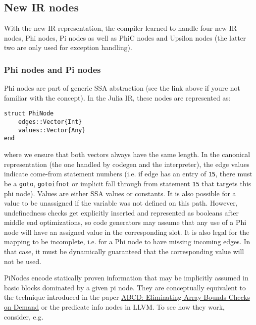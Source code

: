 \hypertarget{14402415240566144810}{}


\subsection{New IR nodes}



With the new IR representation, the compiler learned to handle four new IR nodes, Phi nodes, Pi nodes as well as PhiC nodes and Upsilon nodes (the latter two are only used for exception handling).



\hypertarget{919068206461821671}{}


\subsubsection{Phi nodes and Pi nodes}



Phi nodes are part of generic SSA abstraction (see the link above if you{\textquotesingle}re not familiar with the concept). In the Julia IR, these nodes are represented as:




\begin{lstlisting}
struct PhiNode
    edges::Vector{Int}
    values::Vector{Any}
end
\end{lstlisting}



where we ensure that both vectors always have the same length. In the canonical representation (the one handled by codegen and the interpreter), the edge values indicate come-from statement numbers (i.e. if edge has an entry of \texttt{15}, there must be a \texttt{goto}, \texttt{gotoifnot} or implicit fall through from statement \texttt{15} that targets this phi node). Values are either SSA values or constants. It is also possible for a value to be unassigned if the variable was not defined on this path. However, undefinedness checks get explicitly inserted and represented as booleans after middle end optimizations, so code generators may assume that any use of a Phi node will have an assigned value in the corresponding slot. It is also legal for the mapping to be incomplete, i.e. for a Phi node to have missing incoming edges. In that case, it must be dynamically guaranteed that the corresponding value will not be used.



PiNodes encode statically proven information that may be implicitly assumed in basic blocks dominated by a given pi node. They are conceptually equivalent to the technique introduced in the paper \href{https://dl.acm.org/citation.cfm?id=358438.349342}{ABCD: Eliminating Array Bounds Checks on Demand} or the predicate info nodes in LLVM. To see how they work, consider, e.g.




